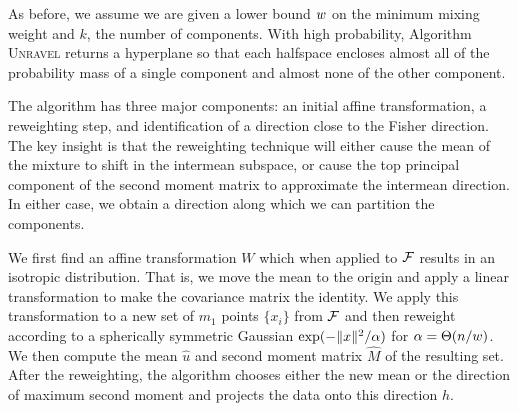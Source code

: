 \documentclass{book}
\numberwithin{exercise}{chapter}
\begin{document}
As before, we assume we are given a lower bound $w$ on the minimum mixing
weight and $k$, the number of components.  With high
probability,  Algorithm \textsc{Unravel} returns a hyperplane so that each halfspace encloses almost
all of the probability mass of a single component and almost none of
the other component.

The algorithm has three major components: an initial affine
transformation, a reweighting step, and identification of a direction
close to the Fisher direction. The key
insight is that the reweighting technique will either cause the mean
of the mixture to shift in the intermean subspace, or cause the top
principal component of the second moment matrix to approximate
the intermean direction.  In either case, we obtain a direction along
which we can partition the components.

We first find an affine transformation $W$ which when applied to
${\mathcal{F}}$ results in an isotropic distribution.  That is, we move the
mean to the origin and apply a linear transformation to make the
covariance matrix the identity. We apply this transformation to a new
set of $m_1$ points $\{x_i\}$ from ${\mathcal{F}}$ and then reweight according
to a spherically symmetric Gaussian $\exp(-\|x\|^2/{\alpha})$ for
${\alpha} = \Theta(n/w)$.  We then compute the mean $\hat{u}$ and second
moment matrix $\hat{M}$ of the resulting set. After the reweighting, the algorithm chooses either the new mean or the direction of maximum second moment and projects the data onto this direction $h$.

\begin{center}
\end{center}
\end{document}
